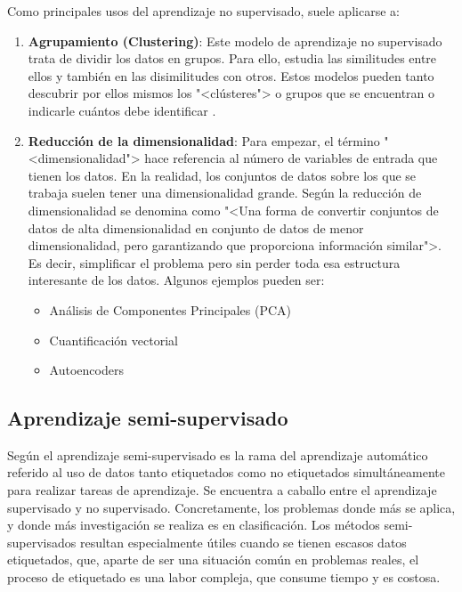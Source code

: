 Como principales usos del aprendizaje no supervisado, suele aplicarse a:
\vspace{-4px}
\begin{enumerate}
    \item \textbf{Agrupamiento (Clustering)}: Este modelo de aprendizaje no
    supervisado trata de dividir los datos en grupos. Para ello, estudia las
    similitudes entre ellos y también en las disimilitudes con otros. Estos
    modelos pueden tanto descubrir por ellos mismos los "<clústeres"> o grupos
    que se encuentran o indicarle cuántos debe identificar \cite{salim:usl}.
    \item \textbf{Reducción de la dimensionalidad}: Para empezar, el término
    "<dimensionalidad"> hace referencia al número de variables de entrada que
    tienen los datos. En la realidad, los conjuntos de datos sobre los que se
    trabaja suelen tener una dimensionalidad grande. Según
    \cite{javatpoint:reduccionsdims} la reducción de dimensionalidad se denomina
    como "<Una forma de convertir conjuntos de datos de alta dimensionalidad en
    conjunto de datos de menor dimensionalidad, pero garantizando que proporciona
    información similar">. Es decir, simplificar el problema pero sin perder
    toda esa estructura interesante de los datos. Algunos ejemplos pueden ser:
    \begin{itemize}
        \item Análisis de Componentes Principales (PCA)
        \item Cuantificación vectorial
        \item Autoencoders
    \end{itemize}
\end{enumerate}

\subsection{Aprendizaje semi-supervisado}

Según \cite{vanEngelen2020} el aprendizaje semi-supervisado es la rama del
aprendizaje automático referido al uso de datos tanto etiquetados como no
etiquetados simultáneamente para realizar tareas de aprendizaje. Se encuentra a
caballo  entre el aprendizaje supervisado y no supervisado. Concretamente, los
problemas donde más se aplica, y donde más investigación se realiza es en
clasificación. Los métodos semi-supervisados resultan especialmente útiles
cuando se tienen escasos datos etiquetados, que, aparte de ser una situación
común en problemas reales, el proceso de etiquetado es una labor compleja, que
consume tiempo y es costosa.

